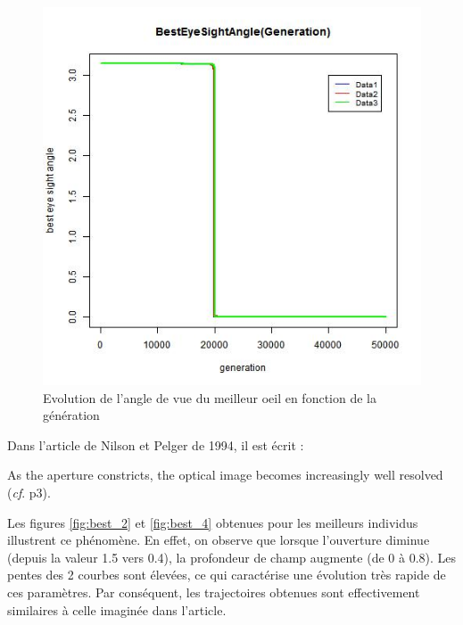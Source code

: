 \documentclass[a4paper,11pt]{article}
\begin{document}
\begin{figure}[htbp]
\begin{center}
\includegraphics[width=.5\linewidth]{best_eye_sight_angle.jpeg}
\caption{Evolution de l'angle de vue du meilleur oeil en fonction de la génération}
\label{fig:best_9}
\end{center}
\end{figure}

Dans l'article de Nilson et Pelger de 1994, il est écrit : 

\begin{displayquote}
As the aperture constricts, the optical image becomes increasingly well resolved (\textit{cf}. p3).
\end{displayquote}

Les figures \ref{fig:best_2} et \ref{fig:best_4} obtenues pour les meilleurs individus illustrent ce phénomène. En effet, on observe que lorsque l'ouverture diminue (depuis la valeur 1.5 vers 0.4), la profondeur de champ augmente (de 0 à 0.8). Les pentes des 2 courbes sont élevées, ce qui caractérise une évolution très rapide de ces paramètres. Par conséquent, les trajectoires obtenues sont effectivement similaires à celle imaginée dans l'article.
\end{document}
